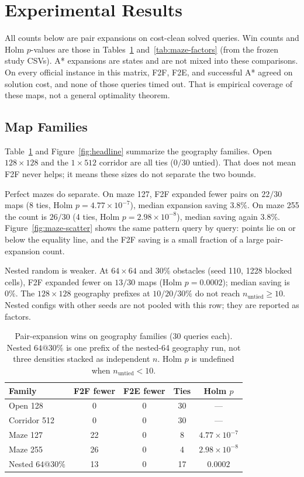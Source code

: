 \section{Experimental Results}

All counts below are pair expansions on cost-clean solved queries. Win counts and Holm \(p\)-values are those in Tables~\ref{tab:headline} and~\ref{tab:maze-factors} (from the frozen study CSVs). A* expansions are states and are not mixed into these comparisons. On every official instance in this matrix, F2F, F2E, and successful A* agreed on solution cost, and none of those queries timed out. That is empirical coverage of these maps, not a general optimality theorem.

\subsection{Map Families}

Table~\ref{tab:headline} and Figure~\ref{fig:headline} summarize the geography families. Open \(128\times128\) and the \(1\times512\) corridor are all ties (\(0/30\) untied). That does not mean F2F never helps; it means these sizes do not separate the two bounds.

Perfect mazes do separate. On maze 127, F2F expanded fewer pairs on \(22/30\) maps (8 ties, Holm \(p=4.77\times10^{-7}\)), median expansion saving \(3.8\%\). On maze 255 the count is \(26/30\) (4 ties, Holm \(p=2.98\times10^{-8}\)), median saving again \(3.8\%\). Figure~\ref{fig:maze-scatter} shows the same pattern query by query: points lie on or below the equality line, and the F2F saving is a small fraction of a large pair-expansion count.

Nested random is weaker. At \(64\times64\) and \(30\%\) obstacles (seed 110, 1228 blocked cells), F2F expanded fewer on \(13/30\) maps (Holm \(p=0.0002\)); median saving is \(0\%\). The \(128\times128\) geography prefixes at \(10/20/30\%\) do not reach \(n_{\mathrm{untied}}\ge 10\). Nested configs with other seeds are not pooled with this row; they are reported as factors.

\begin{table}[tb]
\centering
\small
\setlength{\tabcolsep}{4pt}
\caption{Pair-expansion wins on geography families (30 queries each). Nested \(64@30\%\) is one prefix of the nested-64 geography run, not three densities stacked as independent \(n\). Holm \(p\) is undefined when \(n_{\mathrm{untied}}<10\).}
\label{tab:headline}
\begin{tabular}{@{}lcccc@{}}
\toprule
Family & F2F fewer & F2E fewer & Ties & Holm \(p\) \\
\midrule
Open 128 & 0 & 0 & 30 & --- \\
Corridor 512 & 0 & 0 & 30 & --- \\
Maze 127 & 22 & 0 & 8 & \(4.77\times10^{-7}\) \\
Maze 255 & 26 & 0 & 4 & \(2.98\times10^{-8}\) \\
Nested \(64@30\%\) & 13 & 0 & 17 & \(0.0002\) \\
\bottomrule
\end{tabular}
\end{table}

